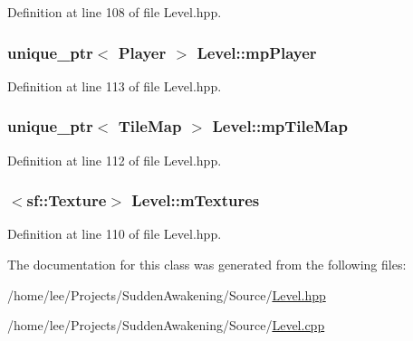Definition at line 108 of file Level.\-hpp.

\hypertarget{class_level_a1cb20848f0e9d49a6469b4682e105d94}{
\subsubsection[{mp\-Player}]{\setlength{\rightskip}{0pt plus 5cm}unique\-\_\-ptr$<$ {\bf Player} $>$ Level\-::mp\-Player\hspace{0.3cm}{\ttfamily [protected]}}}\label{class_level_a1cb20848f0e9d49a6469b4682e105d94}


Definition at line 113 of file Level.\-hpp.

\hypertarget{class_level_a2294842a4de2c0fbe9b28a670088b5c4}{
\subsubsection[{mp\-Tile\-Map}]{\setlength{\rightskip}{0pt plus 5cm}unique\-\_\-ptr$<$ {\bf Tile\-Map} $>$ Level\-::mp\-Tile\-Map\hspace{0.3cm}{\ttfamily [protected]}}}\label{class_level_a2294842a4de2c0fbe9b28a670088b5c4}


Definition at line 112 of file Level.\-hpp.

\hypertarget{class_level_a17bf54432fa53317ab5d7ffffbfdec6f}{
\subsubsection[{m\-Textures}]{$<$sf\-::\-Texture$>$ Level\-::m\-Textures\hspace{0.3cm}{\ttfamily [protected]}}}\label{class_level_a17bf54432fa53317ab5d7ffffbfdec6f}


Definition at line 110 of file Level.\-hpp.



The documentation for this class was generated from the following files\-:\begin{DoxyCompactItemize}
\item 
/home/lee/\-Projects/\-Sudden\-Awakening/\-Source/\hyperlink{_level_8hpp}{Level.\-hpp}\item 
/home/lee/\-Projects/\-Sudden\-Awakening/\-Source/\hyperlink{_level_8cpp}{Level.\-cpp}\end{DoxyCompactItemize}
